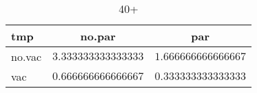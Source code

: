 %
\begin{table}[!tbp]
\caption{40+\label{40+}} 
\begin{center}
\begin{tabular}{lrr}
\hline\hline
\multicolumn{1}{l}{tmp}&\multicolumn{1}{c}{no.par}&\multicolumn{1}{c}{par}\tabularnewline
\hline
no.vac&$3.333333333333333$&$1.666666666666667$\tabularnewline
vac&$0.666666666666667$&$0.333333333333333$\tabularnewline
\hline
\end{tabular}
\end{center}
\end{table}

